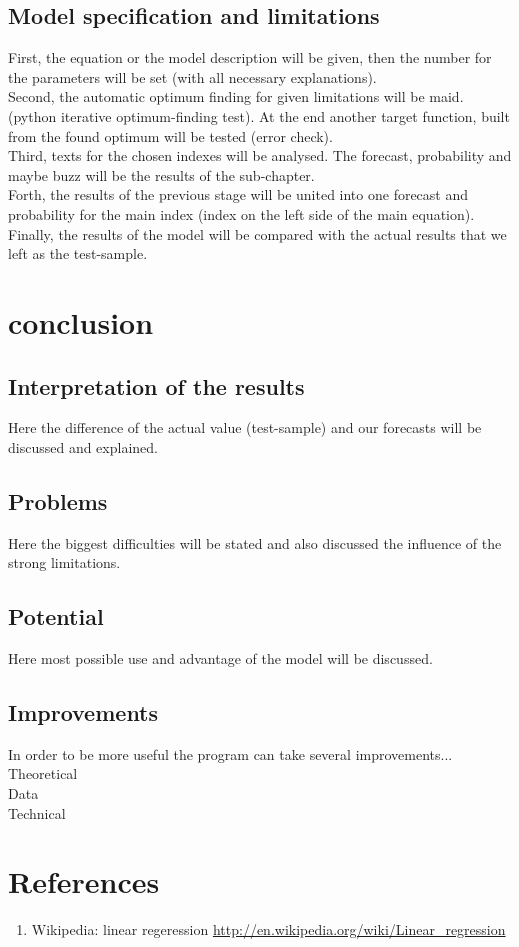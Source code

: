 \documentclass {article}
\begin{document}
\subsection{Model specification and limitations}
First, the equation or the model description will be given, then the number for the parameters will be set (with all necessary explanations).\\
Second, the automatic optimum finding for given limitations will be maid. (python iterative optimum-finding test). At the end another target function, built from the found optimum will be tested (error check).\\
Third, texts for the chosen indexes will be analysed. The forecast, probability and maybe buzz will be the results of the sub-chapter.\\
Forth, the results of the previous stage will be united into one forecast and probability for the main index (index on the left side of the main equation).\\
Finally, the results of the model will be compared with the actual results that we left as the test-sample.

\newpage
\section{conclusion}
\subsection{Interpretation of the results}
Here the difference of the actual value (test-sample) and our forecasts will be discussed and explained.
\subsection{Problems}
Here the biggest difficulties will be stated and also discussed the influence of the strong limitations.
\subsection{Potential}
Here most possible use and advantage of the model will be discussed.
\subsection{Improvements}
In order to be more useful the program can take several improvements...\\
Theoretical\\
Data\\
Technical

\newpage
\section{References}
\begin{enumerate}
	\item Wikipedia: linear regeression \url{http://en.wikipedia.org/wiki/Linear_regression}
\end{enumerate}
\end{document}
